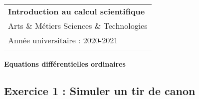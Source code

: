 \documentclass[a4paper,12pt]{article} %
\begin{document}



\thispagestyle{empty} %

\begin{tabular}{p{15.5cm}} %
{\large \bf Introduction au calcul scientifique} \\
Arts \& Métiers Sciences \& Technologies \\
Année universitaire : 2020-2021 \\
\hline %
\\
\end{tabular} %

\vspace*{0.3cm} %

\begin{center} %
	{\Large \bf Equations différentielles ordinaires} %
	\vspace{2mm} %
\end{center}  

\vspace{0.4cm}


\subsection*{Exercice 1 : Simuler un tir de canon}
\end{document}
